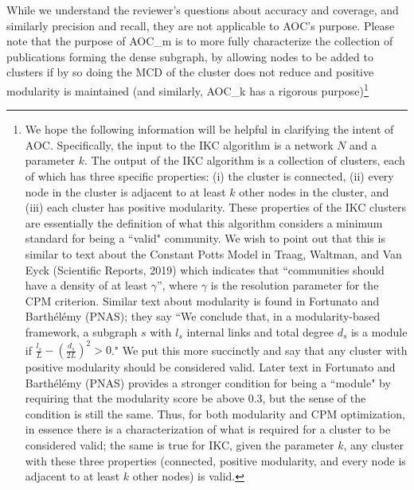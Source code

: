 \documentclass[11pt, oneside]{article}   	%
\begin{document}
\vspace{2 mm} While we understand the reviewer's questions about accuracy and coverage, and similarly precision and recall, they are not applicable to AOC's purpose.  Please note that   the purpose of AOC\_m is to more fully characterize the collection of publications forming the dense subgraph, by allowing  nodes to be added to clusters if by so doing the MCD of the cluster does not reduce and positive modularity is maintained (and similarly, AOC\_k has a rigorous purpose)\footnote{ We hope the following information will be helpful in clarifying the intent of AOC.  Specifically, the input to the IKC algorithm is a network $N$ and a parameter $k$. The output of the IKC algorithm is a collection of clusters, each of which has three specific properties: (i) the cluster is connected, (ii) every node in the cluster is adjacent to at least $k$ other nodes in the cluster, and (iii) each cluster has positive modularity. These properties of the IKC clusters are essentially the definition of what this algorithm considers  a minimum standard for being a ``valid" community.  We wish to point out that this is similar to text about the Constant Potts Model in Traag, Waltman, and Van Eyck (Scientific Reports, 2019) which indicates that ``communities should have a density of at least $\gamma$'', where $\gamma$ is the resolution parameter for the CPM criterion.  Similar text about modularity is found in Fortunato and Barth\'el\'emy (PNAS); they  say ``We conclude that, in a modularity-based framework, a subgraph $s$ with $l_s$ internal links and total degree $d_s$ is a 
module if $\frac{l_s}{L} - \left( \frac{d_s}{2L} \right) ^2 > 0$."  We put this more succinctly and say that any cluster with positive modularity should be considered valid. 
Later text in Fortunato and Barth\'el\'emy (PNAS) provides a stronger condition for being a ``module" by requiring that the modularity score be above 0.3, but the sense of the condition is still the same. Thus, for both modularity and CPM optimization, in essence there is a characterization of what is required for a cluster to be considered valid; the same is true for IKC, given the parameter $k$, any cluster with these three properties (connected, positive modularity, and every node is adjacent to at least $k$ other nodes) is valid. 

}
\end{document}
